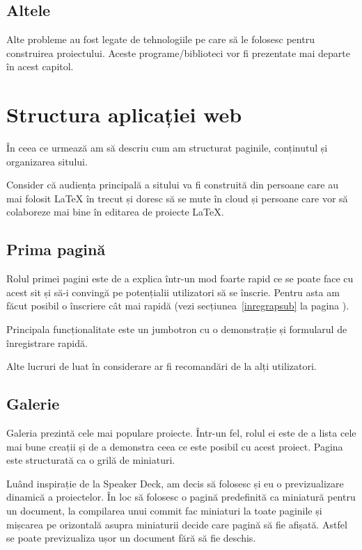 \documentclass[a4wide,12pt]{report}
\newcommand{\eng}[1]{{#1}} %
\begin{document}
\subsection{Altele}

Alte probleme au fost legate de tehnologiile pe care să le folosesc pentru
construirea proiectului. Aceste programe/biblioteci vor fi prezentate mai departe
în acest capitol.

\section{Structura aplicației web}

În ceea ce urmează am să descriu cum am structurat paginile, conținutul și
organizarea sitului.

Consider că audiența principală a sitului va fi construită din persoane care au
mai folosit \LaTeX{} în trecut și doresc să se mute în \eng{cloud} și persoane
care vor să colaboreze mai bine în editarea de proiecte \LaTeX{}.

\subsection{Prima pagină}

Rolul primei pagini este de a explica într-un mod foarte rapid ce se poate face
cu acest sit și să-i convingă pe potențialii utilizatori să se înscrie. Pentru
asta am făcut posibil o înscriere cât mai rapidă (vezi
secțiunea~\ref{inregrapsub} la pagina \pageref{inregrapsub}).

Principala funcționalitate este un \eng{jumbotron} cu o demonstrație și
formularul de înregistrare rapidă.

Alte lucruri de luat în considerare ar fi recomandări de la alți utilizatori.

\subsection{Galerie}
\label{galeriesub}

Galeria prezintă cele mai populare proiecte. Într-un fel, rolul ei este de a
lista cele mai bune creații și de a demonstra ceea ce este posibil cu acest
proiect. Pagina este structurată ca o grilă de miniaturi.

Luând inspirație de la Speaker Deck, am decis să folosesc și eu o
previzualizare dinamică a proiectelor. În loc să folosesc o pagină predefinită
ca miniatură pentru un document, la compilarea unui \eng{commit} fac miniaturi
la toate paginile și mișcarea pe orizontală asupra miniaturii decide care pagină
să fie afișată. Astfel se poate previzualiza ușor un document fără să fie
deschis.
\end{document}
